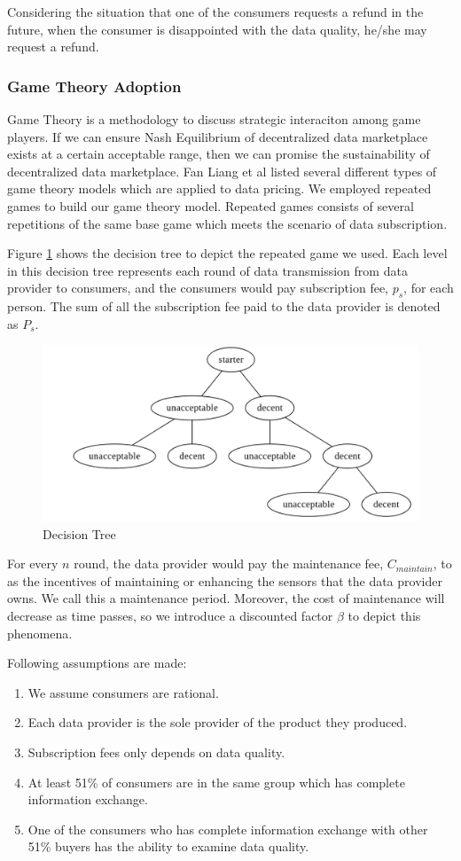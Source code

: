 \documentclass[journal,article,applsci,submit,moreauthors,pdftex]{Definitions/mdpi}
\begin{document}
Considering the situation that one of the consumers requests a refund in the future, when the consumer is disappointed with the data quality, he/she may request a refund.

\subsubsection{Game Theory Adoption}
Game Theory is a methodology to discuss strategic interaciton among game players. If we can ensure Nash Equilibrium of decentralized data marketplace exists at a certain acceptable range, then we can promise the sustainability of decentralized data marketplace. Fan Liang et al\cite{SurveyBigDataPricing} listed several different types of game theory models which are applied to data pricing. We employed repeated games to build our game theory model. Repeated games consists of several repetitions of the same base game which meets the scenario of data subscription.

Figure \ref{fig:decision_tree} shows the decision tree to depict the repeated game we used. Each level in this decision tree represents each round of data transmission from data provider to consumers, and the consumers would pay subscription fee, $p_s$, for each person. The sum of all the subscription fee paid to the data provider is denoted as $P_s$.

\begin{figure}[H] \centering \includegraphics[width=3.3 in]{decision_tree} \caption{Decision Tree}
    \label{fig:decision_tree} \end{figure}
For every $n$ round, the data provider would pay the maintenance fee, $C_{maintain}$, to as the incentives of maintaining or enhancing the sensors that the data provider owns. We call this a maintenance period. Moreover, the cost of maintenance will decrease as time passes, so we introduce a discounted factor $\beta$ to depict this phenomena.

Following assumptions are made:
\begin{enumerate}
    \item  We assume consumers are rational. \label{rational_man}
    \item  Each data provider is the sole provider of the product they produced. \label{monopoly}
    \item  Subscription fees only depends on data quality. \label{fee_vs_quality}
    \item  At least 51\% of consumers are in the same group which has complete information exchange.\label{51_in_group}
    \item  One of the consumers who has complete information exchange with other 51\% buyers has the ability to examine data quality. \label{1_in_51}
\end{enumerate}
\end{document}
